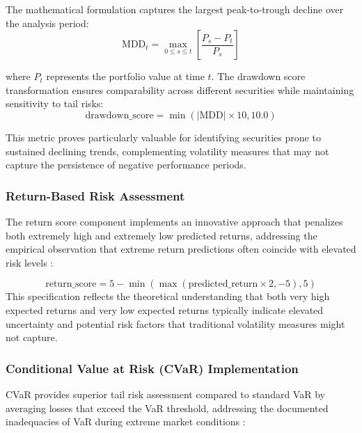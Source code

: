 \documentclass[3p,times,procedia]{elsarticle}
\begin{document}
The mathematical formulation captures the largest peak-to-trough decline over the analysis period:
\begin{equation}
\text{MDD}_t = \max_{0 \leq s \leq t} \left[ \frac{P_s - P_t}{P_s} \right]
\end{equation}

where $P_t$ represents the portfolio value at time $t$. The drawdown score transformation ensures comparability across different securities while maintaining sensitivity to tail risks:
\begin{equation}
\text{drawdown\_score} = \min(|\text{MDD}| \times 10, 10.0)
\end{equation}

This metric proves particularly valuable for identifying securities prone to sustained declining trends, complementing volatility measures that may not capture the persistence of negative performance periods.
\vspace{1cm}

\subsubsection{{Return-Based Risk Assessment}}

The return score component implements an innovative approach that penalizes both extremely high and extremely low predicted returns, addressing the empirical observation that extreme return predictions often coincide with elevated risk levels \cite{Harvey2016}:

\vspace{-0.1cm}
\begin{equation}
\text{return\_score} = 5 - \min(\max(\text{predicted\_return} \times 2, -5), 5)
\end{equation}
This specification reflects the theoretical understanding that both very high expected returns and very low expected returns typically indicate elevated uncertainty and potential risk factors that traditional volatility measures might not capture.

\subsubsection{{Conditional Value at Risk (CVaR) Implementation}}

CVaR provides superior tail risk assessment compared to standard VaR by averaging losses that exceed the VaR threshold, addressing the documented inadequacies of VaR during extreme market conditions \cite{Rockafellar2000}:
\end{document}
